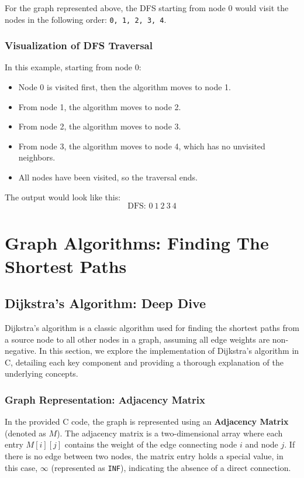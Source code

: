 \documentclass{book}
\begin{document}
For the graph represented above, the DFS starting from node 0 would visit the nodes in the following order: \texttt{0, 1, 2, 3, 4}.

\subsection{Visualization of DFS Traversal}

In this example, starting from node 0:
\begin{itemize}
    \item Node 0 is visited first, then the algorithm moves to node 1.
    \item From node 1, the algorithm moves to node 2.
    \item From node 2, the algorithm moves to node 3.
    \item From node 3, the algorithm moves to node 4, which has no unvisited neighbors.
    \item All nodes have been visited, so the traversal ends.
\end{itemize}

The output would look like this:
\[
\text{DFS: } 0 \ 1 \ 2 \ 3 \ 4
\]
\thispagestyle{empty}
\chapter{Graph Algorithms: Finding The Shortest Paths}

\section{Dijkstra's Algorithm: Deep Dive}

Dijkstra's algorithm is a classic algorithm used for finding the shortest paths from a source node to all other nodes in a graph, assuming all edge weights are non-negative. In this section, we explore the implementation of Dijkstra's algorithm in C, detailing each key component and providing a thorough explanation of the underlying concepts.

\subsection{Graph Representation: Adjacency Matrix}

In the provided C code, the graph is represented using an \textbf{Adjacency Matrix} (denoted as \( M \)). The adjacency matrix is a two-dimensional array where each entry \( M[i][j] \) contains the weight of the edge connecting node \( i \) and node \( j \). If there is no edge between two nodes, the matrix entry holds a special value, in this case, \(\infty\) (represented as \texttt{INF}), indicating the absence of a direct connection. 
\end{document}
